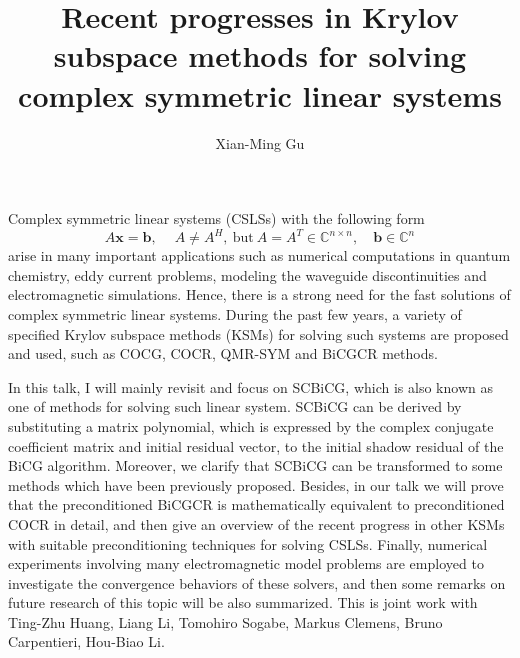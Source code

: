 \documentclass{article}
\title{Recent progresses in Krylov subspace methods for solving complex symmetric linear systems}
\author{Xian-Ming Gu}
\affil{PhD student at Rijksuniversiteit Groningen and University of Electronic Science and Technology of China}
\date{}
\begin{document}
\maketitle
\setcounter{page}{5}
Complex symmetric linear systems (CSLSs) with the following form
\begin{equation*}
A{\bm x} = {\bm b}, \quad\ A\neq A^H,\ \mathrm{but}\ A = A^T \in
\mathbb{C}^{n\times n},\quad {\bm b}\in \mathbb{C}^n
\end{equation*}
arise in many important applications such as numerical computations
in quantum chemistry, eddy current problems, modeling the waveguide
discontinuities and electromagnetic simulations. Hence, there is a
strong need for the fast solutions of complex symmetric linear systems.
During the past few years, a variety of specified Krylov subspace methods
(KSMs) for solving such systems are proposed and used, such as COCG, COCR,
QMR-SYM and BiCGCR methods.

In this talk, I will mainly revisit and focus on SCBiCG, which is also
known as one of methods for solving such linear system. SCBiCG can be
derived by substituting a matrix polynomial, which is expressed by the
complex conjugate coefficient matrix and initial residual vector, to
the initial shadow residual of the BiCG algorithm. Moreover, we clarify
that SCBiCG can be transformed to some methods which have been previously
proposed. Besides, in our talk we will prove that the preconditioned BiCGCR
is mathematically equivalent to preconditioned COCR in detail, and then give
an overview of the recent progress in other KSMs with suitable preconditioning
techniques for solving CSLSs. Finally, numerical experiments involving many
electromagnetic model problems are employed to investigate the convergence
behaviors of these solvers, and then some remarks on future research of this
topic will be also summarized.
\newline
\newline
\indent This is joint work with Ting-Zhu Huang, Liang Li, Tomohiro Sogabe,
Markus Clemens, Bruno Carpentieri, Hou-Biao Li.
\end{document}
